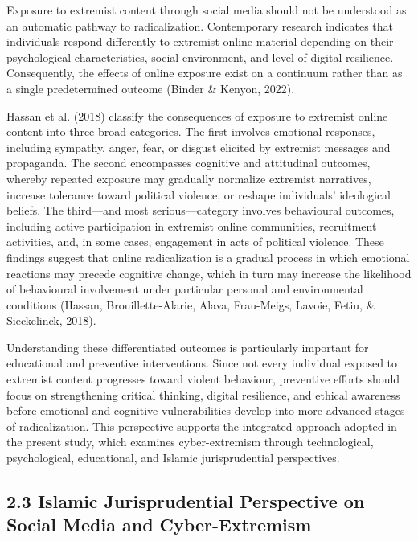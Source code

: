 \documentclass[10pt]{NSP1}
\begin{document}
	Exposure to extremist content through social media should not be understood as an automatic pathway to radicalization. Contemporary research indicates that individuals respond differently to extremist online material depending on their psychological characteristics, social environment, and level of digital resilience. Consequently, the effects of online exposure exist on a continuum rather than as a single predetermined outcome (Binder \& Kenyon, 2022).
	
	Hassan et al. (2018) classify the consequences of exposure to extremist online content into three broad categories. The first involves emotional responses, including sympathy, anger, fear, or disgust elicited by extremist messages and propaganda. The second encompasses cognitive and attitudinal outcomes, whereby repeated exposure may gradually normalize extremist narratives, increase tolerance toward political violence, or reshape individuals' ideological beliefs. The third—and most serious—category involves behavioural outcomes, including active participation in extremist online communities, recruitment activities, and, in some cases, engagement in acts of political violence. These findings suggest that online radicalization is a gradual process in which emotional reactions may precede cognitive change, which in turn may increase the likelihood of behavioural involvement under particular personal and environmental conditions (Hassan, Brouillette-Alarie, Alava, Frau-Meigs, Lavoie, Fetiu, \& Sieckelinck, 2018).
	
	Understanding these differentiated outcomes is particularly important for educational and preventive interventions. Since not every individual exposed to extremist content progresses toward violent behaviour, preventive efforts should focus on strengthening critical thinking, digital resilience, and ethical awareness before emotional and cognitive vulnerabilities develop into more advanced stages of radicalization. This perspective supports the integrated approach adopted in the present study, which examines cyber-extremism through technological, psychological, educational, and Islamic jurisprudential perspectives.
	
	\subsection*{2.3 Islamic Jurisprudential Perspective on Social Media and Cyber-Extremism}
	
\end{document}
